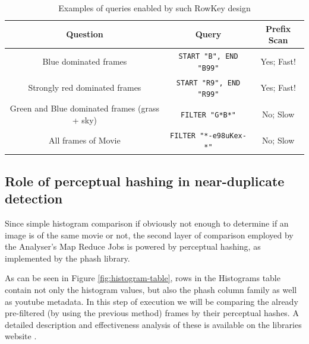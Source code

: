 \begin{table}[ch!]
  \centering
  \begin{tabular}{|c|c|c|}
  \hline
  \textbf{Question}                  & \textbf{Query}                    & Prefix Scan \\ \hline
  Blue dominated frames              & \verb|START "B", END "B99"|       & Yes; Fast! \\ \hline
  Strongly red dominated frames      & \verb|START "R9", END "R99"|      & Yes; Fast! \\ \hline
  Green and Blue dominated frames (grass + sky) & \verb|FILTER "G*B*"|   & No; Slow \\ \hline
  All frames of Movie                & \verb|FILTER "*-e98uKex-*"|       & No; Slow \\ \hline
  \end{tabular}
  \caption{Examples of queries enabled by such RowKey design}
  \label{tab:scans}
\end{table}


\subsection{Role of perceptual hashing in near-duplicate detection}
\label{sec:perceptual-hashing}
Since simple histogram comparison if obviously not enough to determine if an image is of the same movie or not,
the second layer of comparison employed by the Analyser's Map Reduce Jobs is powered by perceptual hashing, as implemented by the phash \cite{phash} library.

As can be seen in Figure \ref{fig:histogram-table}, rows in the Histograms table contain not only the histogram values, but also the phash column family as well as youtube metadata. In this step of execution we will be comparing the already pre-filtered (by using the previous method) frames by their perceptual hashes. A detailed description and effectiveness analysis of these is available on the libraries website \cite{phash}.

